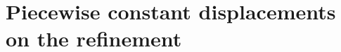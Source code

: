 \documentclass[12pt]{amsart}
\numberwithin{equation}{section}
\newtheorem{theorem}{Theorem}[section]
\newtheorem{corollary}[theorem]{Corollary}
\theoremstyle{definition}
\theoremstyle{remark}
\renewcommand{\(}{\bigl(}
\renewcommand{\)}{\bigr)}
\newcommand{\ust}{u^\star}
\newcommand{\Aa}{\mathcal{A}}
\begin{document}











\section{Piecewise constant displacements on the refinement}
\label{sec:P0-disp}
\end{document}
